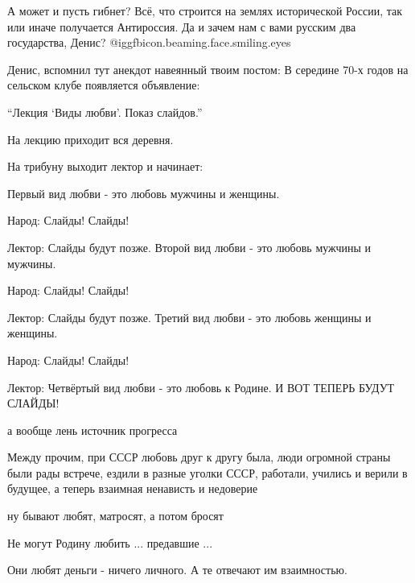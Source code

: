  
 
 
 
 
\zzSecCmt

\begin{itemize} %

А может и пусть гибнет? Всё, что строится на землях исторической России, так
или иначе получается Антироссия. Да и зачем нам с вами русским два государства,
Денис?  @igg{fbicon.beaming.face.smiling.eyes} 


Денис, вспомнил тут анекдот навеянный твоим постом: В середине 70-х годов на
сельском клубе появляется объявление:

\enquote{Лекция \enquote{Виды любви}. Показ слайдов.}

На лекцию приходит вся деревня.

На трибуну выходит лектор и начинает:

Первый вид любви - это любовь мужчины и женщины.

Народ: Слайды! Слайды!

Лектор: Слайды будут позже. Второй вид любви - это любовь мужчины и мужчины.

Народ: Слайды! Слайды!

Лектор: Слайды будут позже. Третий вид любви - это любовь женщины и женщины.

Народ: Слайды! Слайды!

Лектор: Четвёртый вид любви - это любовь к Родине. И ВОТ ТЕПЕРЬ БУДУТ СЛАЙДЫ!

а вообще лень источник прогресса


Между прочим, при СССР любовь друг к другу была, люди огромной страны были рады
встрече, ездили в разные уголки СССР, работали, учились и верили в будущее, а
теперь взаимная ненависть и недоверие

ну бывают любят, матросят, а потом бросят

Не могут Родину любить ... предавшие ...

Они любят деньги - ничего личного. А те отвечают им взаимностью.
\end{itemize} %
